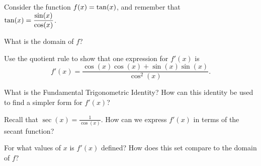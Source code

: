\begin{pa} \label{PA:2.4}
Consider the function $\displaystyle f(x) = \tan(x)$, and remember that \\ $\displaystyle \tan(x) = \frac{\sin(x)}{\cos(x)}$.
\ba
	\item What is the domain of $f$?
	\item Use the quotient rule to show that one expression for $f'(x)$ is
	$$f'(x) = \frac{\cos(x)\cos(x) + \sin(x)\sin(x)}{\cos^2(x)}.$$
	\item What is the Fundamental Trigonometric Identity?  How can this identity be used to find a simpler form for $f'(x)$?
	\item Recall that $\sec(x) = \frac{1}{\cos(x)}$.  How can we express $f'(x)$ in terms of the secant function?
	\item For what values of $x$ is $f'(x)$ defined?  How does this set compare to the domain of $f$?
\ea
\end{pa} 
\afterpa